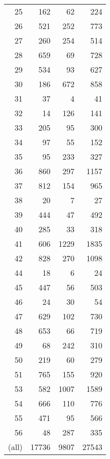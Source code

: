 \documentclass[11pt]{article}
\begin{document}
\begin{itemize}
\begin{center}
\begin{tabular}{rrrr}
    25  &    162  &    62  &    224  \\
    26  &    521  &   252  &    773  \\
    27  &    260  &   254  &    514  \\
    28  &    659  &    69  &    728  \\
    29  &    534  &    93  &    627  \\
    30  &    186  &   672  &    858  \\
    31  &     37  &     4  &     41  \\
    32  &     14  &   126  &    141  \\
    33  &    205  &    95  &    300  \\
    34  &     97  &    55  &    152  \\
    35  &     95  &   233  &    327  \\
    36  &    860  &   297  &   1157  \\
    37  &    812  &   154  &    965  \\
    38  &     20  &     7  &     27  \\
    39  &    444  &    47  &    492  \\
    40  &    285  &    33  &    318  \\
    41  &    606  &  1229  &   1835  \\
    42  &    828  &   270  &   1098  \\
    44  &     18  &     6  &     24  \\
    45  &    447  &    56  &    503  \\
    46  &     24  &    30  &     54  \\
    47  &    629  &   102  &    730  \\
    48  &    653  &    66  &    719  \\
    49  &     68  &   242  &    310  \\
    50  &    219  &    60  &    279  \\
    51  &    765  &   155  &    920  \\
    53  &    582  &  1007  &   1589  \\
    54  &    666  &   110  &    776  \\
    55  &    471  &    95  &    566  \\
    56  &     48  &   287  &    335  \\
 (all)  &  17736  &  9807  &  27543  \\
\end{tabular}
\end{center}






\end{itemize}
\end{document}
